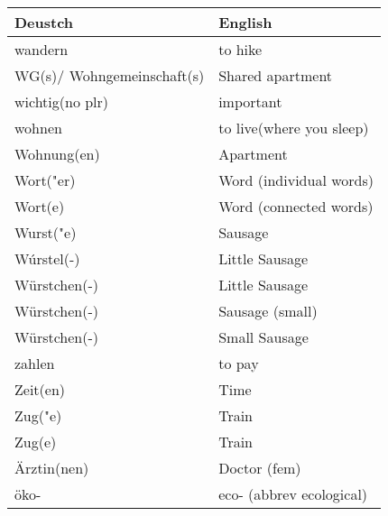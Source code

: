 \documentclass{article}
\renewcommand{\arraystretch}{1}
\begin{document}
\newpage

\begin{minipage}{0.48\textwidth}
    \centering
    \renewcommand{\arraystretch}{1.5}
    \begin{tabular}{|>{\raggedright\arraybackslash}p{3.5cm}|>{\raggedright\arraybackslash}p{3.5cm}|}
        \hline
        \rowcolor{gray!20} \textbf{Deustch} & \textbf{English} \\
        \hline
        wandern & to hike \\\hline
        WG(s)/ Wohngemeinschaft(s) & Shared apartment \\\hline
        wichtig(no plr) & important \\\hline
        wohnen & to live(where you sleep) \\\hline
        Wohnung(en) & Apartment \\\hline
        Wort("er) & Word (individual words) \\\hline
        Wort(e) & Word (connected words) \\\hline
        Wurst("e) & Sausage \\\hline
        Wúrstel(-) & Little Sausage \\\hline
        Würstchen(-) & Little Sausage \\\hline
        Würstchen(-) & Sausage (small) \\\hline
        Würstchen(-) & Small Sausage \\\hline
        zahlen & to pay \\\hline
        Zeit(en) & Time \\\hline
        Zug("e) & Train \\\hline
        Zug(e) & Train \\\hline
        Ärztin(nen) & Doctor (fem) \\\hline
        öko- & eco- (abbrev ecological) \\\hline
    \end{tabular}
\end{minipage}%
\end{document}
